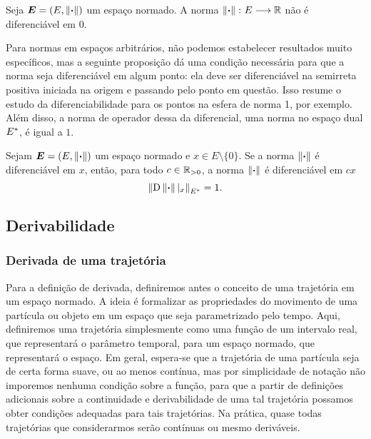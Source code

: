 \begin{proposition}
Seja $\bm E = (E, \left\Vert{\bm{\cdot}}\right\Vert)$ um espaço normado. A norma $\left\Vert{\bm{\cdot}}\right\Vert\colon \allowbreak E \longrightarrow \mathbb{R}$ não é diferenciável em $0$.
\end{proposition}

Para normas em espaços arbitrários, não podemos estabelecer resultados muito específicos, mas a seguinte proposição dá uma condição necessária para que a norma seja diferenciável em algum ponto: ela deve ser diferenciável na semirreta positiva iniciada na origem e passando pelo ponto em questão. Isso resume o estudo da diferenciabilidade para os pontos na esfera de norma 1, por exemplo. Além disso, a norma de operador dessa da diferencial, uma norma no espaço dual $E^{\ast}$, é igual a $1$.

\begin{proposition}
Sejam $\bm E = (E, \left\Vert{\bm{\cdot}}\right\Vert)$ um espaço normado e $x \in E \setminus \{0\}$. Se a norma $\left\Vert{\bm{\cdot}}\right\Vert$ é diferenciável em $x$, então, para todo $c \in \mathbb{R}_{>0}$, a norma $\left\Vert{\bm{\cdot}}\right\Vert$ é diferenciável em $cx$
	\begin{equation*}
	\left\Vert{\mathrm{D}\left\Vert{\bm{\cdot}}\right\Vert|_{x}}\right\Vert_{E^{\ast}} = 1.
	\end{equation*}
\end{proposition}





















\subsection{Derivabilidade}

\subsubsection{Derivada de uma trajetória}

Para a definição de derivada, definiremos antes o conceito de uma trajetória em um espaço normado. A ideia é formalizar as propriedades do movimento de uma partícula ou objeto em um espaço que seja parametrizado pelo tempo. Aqui, definiremos uma trajetória simplesmente como uma função de um intervalo real, que representará o parâmetro temporal, para um espaço normado, que representará o espaço. Em geral, espera-se que a trajetória de uma partícula seja de certa forma suave, ou ao menos contínua, mas por simplicidade de notação não imporemos nenhuma condição sobre a função, para que a partir de definições adicionais sobre a continuidade e derivabilidade de uma tal trajetória possamos obter condições adequadas para tais trajetórias. Na prática, quase todas trajetórias que considerarmos serão contínuas ou mesmo deriváveis.

